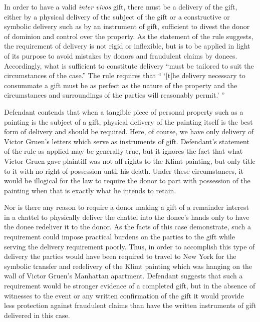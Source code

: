 
In order to have a valid \textit{inter vivos} gift, there must be a delivery of
the gift, either by a physical delivery of the subject of the gift or a
constructive or symbolic delivery such as by an instrument of gift, sufficient
to divest the donor of dominion and control over the property. As the statement
of the rule suggests, the requirement of delivery is not rigid or inflexible,
but is to be applied in light of its purpose to avoid mistakes by donors and
fraudulent claims by donees. Accordingly, what is sufficient to constitute
delivery ``must be tailored to suit the circumstances of the case.'' The rule
requires that `` `[t]he delivery necessary to consummate a gift must be as
perfect as the nature of the property and the circumstances and surroundings of
the parties will reasonably permit.' ''

Defendant contends that when a tangible piece of personal property such as a
painting is the subject of a gift, physical delivery of the painting itself is
the best form of delivery and should be required. Here, of course, we have only
delivery of Victor Gruen's letters which serve as instruments of gift.
Defendant's statement of the rule as applied may be generally true, but it
ignores the fact that what Victor Gruen gave plaintiff was not all rights to
the Klimt painting, but only title to it with no right of possession until his
death. Under these circumstances, it would be illogical for the law to require
the donor to part with possession of the painting when that is exactly what he
intends to retain.

Nor is there any reason to require a donor making a gift of a remainder interest
in a chattel to physically deliver the chattel into the donee's hands only to
have the donee redeliver it to the donor. As the facts of this case
demonstrate, such a requirement could impose practical burdens on the parties
to the gift while serving the delivery requirement poorly. Thus, in order to
accomplish this type of delivery the parties would have been required to travel
to New York for the symbolic transfer and redelivery of the Klimt painting
which was hanging on the wall of Victor Gruen's Manhattan apartment. Defendant
suggests that such a requirement would be stronger evidence of a completed
gift, but in the absence of witnesses to the event or any written confirmation
of the gift it would provide less protection against fraudulent claims than
have the written instruments of gift delivered in this case. 

